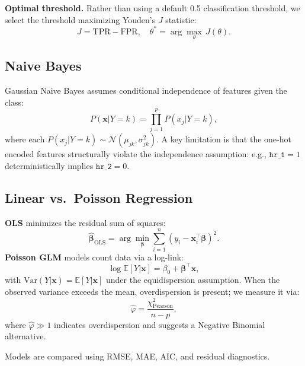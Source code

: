 \documentclass[conference]{IEEEtran}
\begin{document}
\textbf{Optimal threshold.}
Rather than using a default 0.5 classification threshold, we select the threshold maximizing Youden's $J$ statistic:
\begin{equation}
J = \mathrm{TPR} - \mathrm{FPR}, \quad \theta^* = \arg\max_\theta\, J(\theta).
\end{equation}

\subsection{Naive Bayes}
Gaussian Naive Bayes assumes conditional independence of features given the class:
\begin{equation}
P(\mathbf{x}|Y=k) = \prod_{j=1}^{p} P(x_j|Y=k),
\end{equation}
where each $P(x_j|Y=k) \sim \mathcal{N}(\mu_{jk}, \sigma_{jk}^2)$.
A key limitation is that the one-hot encoded features structurally violate the independence assumption: e.g., $\texttt{hr\_1}=1$ deterministically implies $\texttt{hr\_2}=0$.

\subsection{Linear vs.\ Poisson Regression}
\textbf{OLS} minimizes the residual sum of squares:
\begin{equation}
\hat{\boldsymbol{\beta}}_{\mathrm{OLS}} = \arg\min_{\boldsymbol{\beta}} \sum_{i=1}^{n}(y_i - \mathbf{x}_i^\top\boldsymbol{\beta})^2.
\end{equation}
\textbf{Poisson GLM} models count data via a log-link:
\begin{equation}
\log\mathbb{E}[Y|\mathbf{x}] = \beta_0 + \boldsymbol{\beta}^\top\mathbf{x},
\end{equation}
with $\mathrm{Var}(Y|\mathbf{x}) = \mathbb{E}[Y|\mathbf{x}]$ under the equidispersion assumption.
When the observed variance exceeds the mean, overdispersion is present; we measure it via:
\begin{equation}
\hat{\varphi} = \frac{\chi^2_{\text{Pearson}}}{n - p},
\end{equation}
where $\hat{\varphi} \gg 1$ indicates overdispersion and suggests a Negative Binomial alternative.

Models are compared using RMSE, MAE, AIC, and residual diagnostics.

\end{document}
